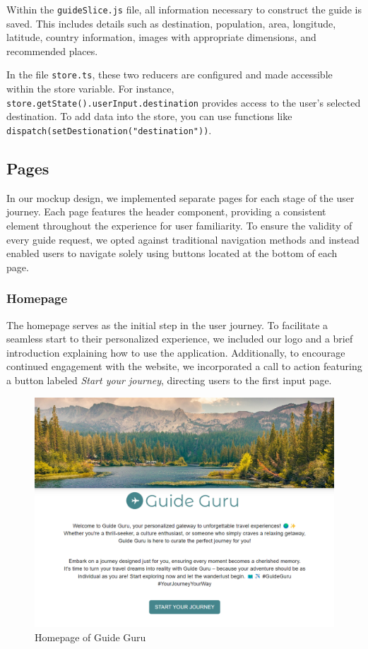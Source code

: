 \documentclass[english,notitlepage,smartquotes]{hgbreport}
\begin{document}
Within the \texttt{guideSlice.js} file, all information necessary to construct the guide is saved. This includes details such as destination, population, area, longitude, latitude, country information, images with appropriate dimensions, and recommended places.

In the file \texttt{store.ts}, these two reducers are configured and made accessible within the store variable. For instance, \texttt{store.getState().userInput.destination} provides access to the user's selected destination. To add data into the store, you can use functions like  \texttt{dispatch(setDestionation("destination"))}.

\subsection{Pages}

In our mockup design, we implemented separate pages for each stage of the user journey. Each page features the header component, providing a consistent element throughout the experience for user familiarity. To ensure the validity of every guide request, we opted against traditional navigation methods and instead enabled users to navigate solely using buttons located at the bottom of each page.

\subsubsection{Homepage}

The homepage serves as the initial step in the user journey. To facilitate a seamless start to their personalized experience, we included our logo and a brief introduction explaining how to use the application. Additionally, to encourage continued engagement with the website, we incorporated a call to action featuring a button labeled \textit{Start your journey}, directing users to the first input page.

\begin{figure}
	\centering
	\includegraphics[width=1\textwidth]{Homepage.png}
	\caption{Homepage of Guide Guru}
\end{figure}
\end{document}
